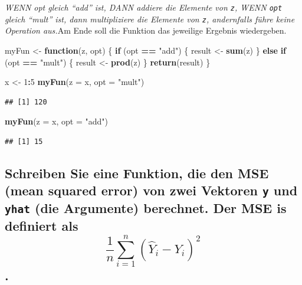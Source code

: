 \documentclass[12pt,a4paper]{article}
\newenvironment{Shaded}{\begin{snugshade}}{\end{snugshade}}
\newcommand{\AttributeTok}[1]{\textcolor[rgb]{0.13,0.29,0.53}{#1}}
\newcommand{\ControlFlowTok}[1]{\textcolor[rgb]{0.13,0.29,0.53}{\textbf{#1}}}
\newcommand{\DecValTok}[1]{\textcolor[rgb]{0.00,0.00,0.81}{#1}}
\newcommand{\FunctionTok}[1]{\textcolor[rgb]{0.13,0.29,0.53}{\textbf{#1}}}
\newcommand{\NormalTok}[1]{#1}
\newcommand{\OtherTok}[1]{\textcolor[rgb]{0.56,0.35,0.01}{#1}}
\newcommand{\SpecialCharTok}[1]{\textcolor[rgb]{0.81,0.36,0.00}{\textbf{#1}}}
\newcommand{\StringTok}[1]{\textcolor[rgb]{0.31,0.60,0.02}{#1}}
\begin{document}
\emph{WENN opt gleich ``add'' ist, DANN addiere die Elemente von
\texttt{z}, WENN \texttt{opt} gleich ``mult'' ist, dann multipliziere
die Elemente von \texttt{z}, andernfalls führe keine Operation
aus.}\newline\newline Am Ende soll die Funktion das jeweilige Ergebnis
wiedergeben.

\begin{Shaded}
\begin{Highlighting}[]
\NormalTok{    myFun }\OtherTok{\textless{}{-}} \ControlFlowTok{function}\NormalTok{(z, opt) \{}
      \ControlFlowTok{if}\NormalTok{ (opt }\SpecialCharTok{==} \StringTok{"add"}\NormalTok{) \{}
\NormalTok{        result }\OtherTok{\textless{}{-}} \FunctionTok{sum}\NormalTok{(z)}
\NormalTok{      \} }\ControlFlowTok{else} \ControlFlowTok{if}\NormalTok{ (opt }\SpecialCharTok{==} \StringTok{"mult"}\NormalTok{) \{}
\NormalTok{        result }\OtherTok{\textless{}{-}} \FunctionTok{prod}\NormalTok{(z)}
\NormalTok{      \}}
      \FunctionTok{return}\NormalTok{(result)}
\NormalTok{    \}}
    
\NormalTok{    x }\OtherTok{\textless{}{-}} \DecValTok{1}\SpecialCharTok{:}\DecValTok{5}
    \FunctionTok{myFun}\NormalTok{(}\AttributeTok{z =}\NormalTok{ x, }\AttributeTok{opt =} \StringTok{"mult"}\NormalTok{)}
\end{Highlighting}
\end{Shaded}

\begin{verbatim}
## [1] 120
\end{verbatim}

\begin{Shaded}
\begin{Highlighting}[]
    \FunctionTok{myFun}\NormalTok{(}\AttributeTok{z =}\NormalTok{ x, }\AttributeTok{opt =} \StringTok{"add"}\NormalTok{)}
\end{Highlighting}
\end{Shaded}

\begin{verbatim}
## [1] 15
\end{verbatim}

\hypertarget{schreiben-sie-eine-funktion-die-den-mse-mean-squared-error-von-zwei-vektoren-y-und-yhat-die-argumente-berechnet.-der-mse-is-definiert-als-displaystyle-frac1nsum_i1n-haty_i---y_i2.}{%
\subsection{\texorpdfstring{Schreiben Sie eine Funktion, die den MSE
(mean squared error) von zwei Vektoren \texttt{y} und \texttt{yhat} (die
Argumente) berechnet. Der MSE is definiert als
\[\displaystyle \frac{1}{n}\sum_{i=1}^n (\hat{Y}_i - Y_i)^2\].}{Schreiben Sie eine Funktion, die den MSE (mean squared error) von zwei Vektoren y und yhat (die Argumente) berechnet. Der MSE is definiert als \textbackslash displaystyle \textbackslash frac\{1\}\{n\}\textbackslash sum\_\{i=1\}\^{}n (\textbackslash hat\{Y\}\_i - Y\_i)\^{}2.}}\label{schreiben-sie-eine-funktion-die-den-mse-mean-squared-error-von-zwei-vektoren-y-und-yhat-die-argumente-berechnet.-der-mse-is-definiert-als-displaystyle-frac1nsum_i1n-haty_i---y_i2.}}
\end{document}
